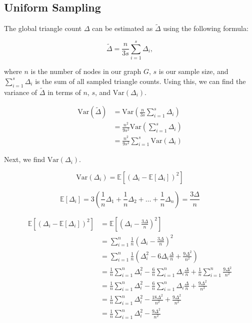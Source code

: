 \documentclass[11pt]{article}
\begin{document}
\subsection{Uniform Sampling}

The global triangle count $\Delta$ can be estimated as $\tilde{\Delta}$ using the following formula:

\[
\tilde{\Delta} = \frac{n}{3s} \sum_{i = 1}^{s} \Delta_i,
\]

where $n$ is the number of nodes in our graph $G$, $s$ is our sample size, and $\sum_{i = 1}^{s} \Delta_i$ is the sum of all sampled triangle counts. 
Using this, we can find the variance of $\tilde{\Delta}$ in terms of $n$, $s$, and $\mathrm{Var}(\Delta_i)$.

\[
\begin{aligned}
\mathrm{Var}(\tilde{\Delta}) &= \mathrm{Var} \left( \frac{n}{3s} \sum_{i=1}^{s} \Delta_i \right) \\
&= \frac{n^2}{9s^2} \mathrm{Var} \left( \sum_{i=1}^{s} \Delta_i \right) \\
&= \frac{n^2}{9s^2} \sum_{i=1}^{s} \mathrm{Var}(\Delta_i)
\end{aligned}
\]

Next, we find $\mathrm{Var}(\Delta_i)$.

\[
\mathrm{Var}(\Delta_i) = \mathbb{E}[(\Delta_i - \mathbb{E}[\Delta_i])^2]
\]

\[
\mathbb{E}[\Delta_i] = 3(\frac{1}{n} \Delta_1 + \frac{1}{n} \Delta_2 + \ldots + \frac{1}{n} \Delta_n) = \frac{3\Delta}{n}
\]

\[
\begin{aligned}
\mathbb{E}[(\Delta_i - \mathbb{E}[\Delta_i])^2] &= \mathbb{E}[(\Delta_i - \frac{3\Delta}{n})^2] \\
&= \sum_{i = 1}^{n} \frac{1}{n} (\Delta_i - \frac{3\Delta}{n})^2 \\
&= \sum_{i = 1}^{n} \frac{1}{n} (\Delta_i^2 - 6 \Delta_i \frac{\Delta}{n} + \frac{9\Delta^2}{n^2}) \\
&= \frac{1}{n} \sum_{i = 1}^{n} \Delta_i^2 - \frac{6}{n} \sum_{i = 1}^{n} \Delta_i \frac{\Delta}{n} + \frac{1}{n} \sum_{i = 1}^{n} \frac{9\Delta^2}{n^2} \\
&= \frac{1}{n} \sum_{i = 1}^{n} \Delta_i^2 - \frac{6}{n} \sum_{i = 1}^{n} \Delta_i \frac{\Delta}{n} + \frac{9\Delta^2}{n^2} \\
&= \frac{1}{n} \sum_{i = 1}^{n} \Delta_i^2 - \frac{18\Delta^2}{n^2} + \frac{9\Delta^2}{n^2} \\
&= \frac{1}{n} \sum_{i = 1}^{n} \Delta_i^2 - \frac{9\Delta^2}{n^2}
\end{aligned}
\]
\end{document}
